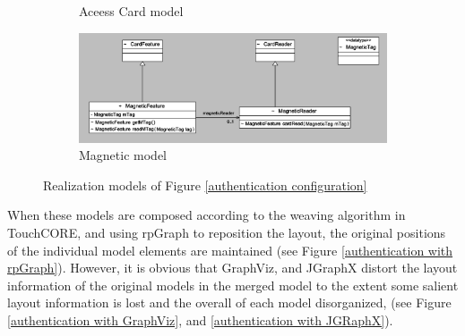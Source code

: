 \begin{figure}
\begin{subfigure}[b]{0.3\linewidth}
        \caption{Aceess Card model}
        \label{access card}
    \end{subfigure}
    \begin{subfigure}[b]{0.3\linewidth}
    	\includegraphics[width=\linewidth]{magneticModel.PNG}
        \caption{Magnetic model}
        \label{magnetic}
    \end{subfigure}
	\caption{Realization models of Figure \ref{authentication configuration}}
    \label{basic realizing models}
\end{figure}

When these models are composed according to the weaving algorithm in TouchCORE, and using rpGraph to reposition the layout, the original positions of the individual model elements are maintained (see Figure \ref{authentication with rpGraph}). However, it is obvious that GraphViz, and JGraphX distort the layout information of the original models in the merged model to the extent some salient layout information is lost and the overall of each model disorganized, (see Figure \ref{authentication with GraphViz}, and \ref{authentication with JGRaphX}).

